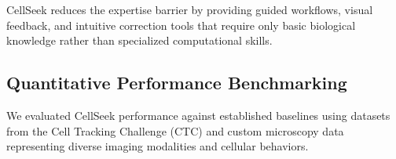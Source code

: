 \documentclass[12pt]{article}
\begin{document}
CellSeek reduces the expertise barrier by providing guided workflows, visual feedback, and intuitive correction tools that require only basic biological knowledge rather than specialized computational skills.

\subsection{Quantitative Performance Benchmarking}

We evaluated CellSeek performance against established baselines using datasets from the Cell Tracking Challenge (CTC) and custom microscopy data representing diverse imaging modalities and cellular behaviors.





\end{document}
